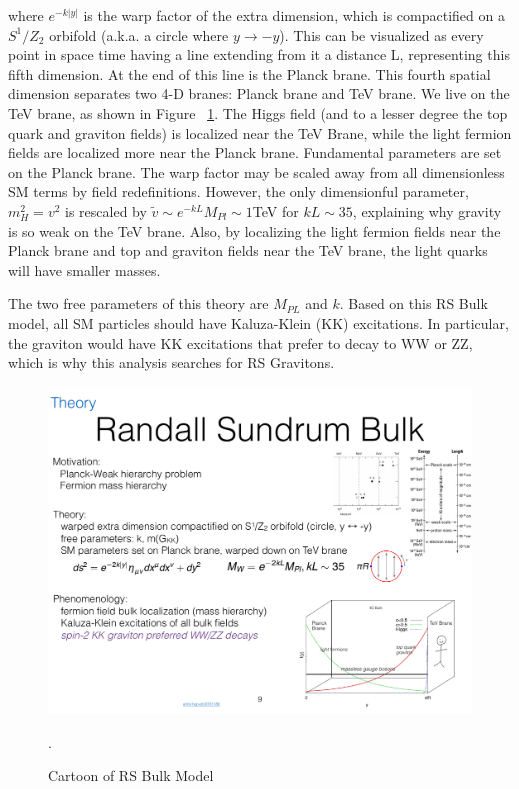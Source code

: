 where $e^{-k|y|}$ is the warp factor of the extra dimension, which is compactified on a $S^{1}/Z_{2}$ orbifold (a.k.a. a circle where $y \rightarrow -y$). This can be visualized as every point in space time having a line extending from it a distance L, representing this fifth dimension. At the end of this line is the Planck brane. This fourth spatial dimension separates two 4-D branes: Planck brane and TeV brane. We live on the TeV brane, as shown in Figure ~\ref{fig:RS_cartoon}. The Higgs field (and to a lesser degree the top quark and graviton fields) is localized near the TeV Brane, while the light fermion fields are localized more near the Planck brane. Fundamental parameters are set on the Planck brane. The warp factor may be scaled away from all dimensionless SM terms by field redefinitions. However, the only dimensionful parameter, $m_{H}^{2}=v^{2}$ is rescaled by $\tilde{v}\sim e^{-kL}M_{Pl}\sim 1$TeV for $kL\sim 35$, explaining why gravity is so weak on the TeV brane. Also, by localizing the light fermion fields near the Planck brane and top and graviton fields near the TeV brane, the light quarks will have smaller masses. 

The two free parameters of this theory are $M_{PL}$ and $k$. Based on this RS Bulk model, all SM particles should have Kaluza-Klein (KK) excitations. In particular, the graviton would have KK excitations that prefer to decay to WW or ZZ, which is why this analysis searches for RS Gravitons. 


\begin{figure}[h!]
  \centering
  \includegraphics[width=\hsize]{figures/Theory/RS_cartoon.pdf}
  \caption{Cartoon of RS Bulk Model}. 
  \label{fig:RS_cartoon}
\end{figure}
\FloatBarrier

